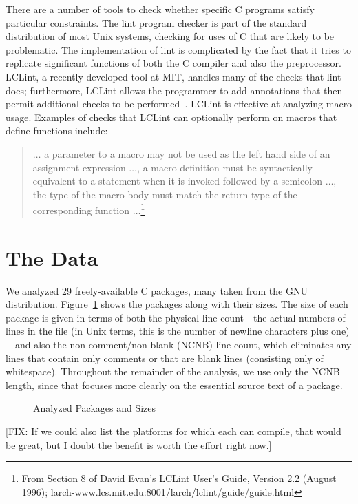 There are a number of tools to check whether specific C programs
satisfy particular constraints.  The lint program checker is part of
the standard distribution of most Unix systems, checking for uses of C
that are likely to be problematic.  The implementation of lint is
complicated by the fact that it tries to replicate significant
functions of both the C compiler and also the preprocessor.  LCLint, a
recently developed tool at MIT, handles many of the checks that lint
does; furthermore, LCLint allows the programmer to add annotations
that then permit additional checks to be
performed~\cite{Evans-fse94}\cite{Evans-pldi96}.  LCLint is effective
at analyzing macro usage.  Examples of checks that LCLint can
optionally perform on macros that define functions include:
\begin{quote}
$\ldots$ a parameter to a macro may not be used as the left hand side
of an assignment expression $\ldots$, a macro definition must be
syntactically equivalent to a statement when it is invoked followed by
a semicolon $\ldots$, the type of the macro body must match the return
type of the corresponding function $\ldots$\footnote{From Section 8 of
David Evan's LCLint User's Guide, Version 2.2 (August 1996); larch-www.lcs.mit.edu:8001/larch/lclint/guide/guide.html}
\end{quote}

\section{The Data}\label{sec:gathering}

We analyzed 29 freely-available C packages, many taken from the GNU
distribution.  Figure~\ref{fig:packages} shows the packages along with
their sizes.  The size of each package is given in terms of both the
physical line count---the actual numbers of lines in the file (in Unix
terms, this is the number of newline characters plus one)---and also
the non-comment/non-blank (NCNB) line count, which eliminates any
lines that contain only comments or that are blank lines (consisting
only of whitespace).  Throughout the remainder of the analysis, we use
only the NCNB length, since that focuses more clearly on the essential
source text of a package.

\begin{figure}

\caption{Analyzed Packages and Sizes\label{fig:packages}}
\end{figure}

[FIX: If we could also list the platforms for which each can compile,
that would be great, but I doubt the benefit is worth the effort right
now.]

